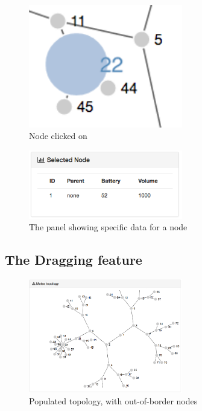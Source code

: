 \begin{figure}[!h]
	\centering
	\includegraphics[width=0.6\textwidth]{res/snodeblue.png}
	\caption{Node clicked on}
	\label{fig:snodeblue}
\end{figure}


\begin{figure}[!h]
	\centering
	\includegraphics[width=0.6\textwidth]{res/snode.png}
	\caption{The panel showing specific data for a node}
	\label{fig:snode}
\end{figure}



\subsection*{The Dragging feature}

\begin{figure}[!h]
	\centering
	\includegraphics[width=0.6\textwidth]{res/populated.png}
	\caption{Populated topology, with out-of-border nodes}
	\label{fig:populated}
\end{figure}


